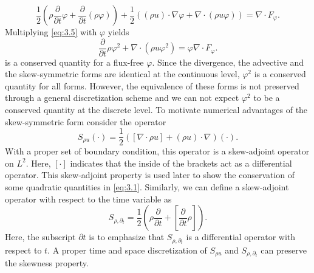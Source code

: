 \begin{equation} \label{eq:3.5}
	\frac{1}{2} \left( \rho \frac{\partial }{\partial t} \varphi + \frac{\partial }{\partial t} (\rho \varphi) \right) + \frac 1 2 \left( (\rho u)\cdot \nabla \varphi + \nabla \cdot (\rho u \varphi) \right) = \nabla \cdot F_{\varphi}.
\end{equation}
Multiplying \eqref{eq:3.5} with $\varphi$ yields
\begin{equation}
	\frac{\partial }{\partial t} \rho \varphi^2 + \nabla \cdot ( \rho u \varphi^2  ) = \varphi \nabla \cdot F_{\varphi}.
\end{equation}
 is a conserved quantity for a flux-free $\varphi$. Since the divergence, the advective and the skew-symmetric forms are identical at the continuous level, $\varphi^2$ is a conserved quantity for all forms. However, the equivalence of these forms is not preserved through a general discretization scheme and we can not expect $\varphi^2$ to be a conserved quantity at the discrete level. To motivate numerical advantages of the skew-symmetric form consider the operator 
\begin{equation}
	S_{\rho u}(\cdot) = \frac 1 2 ( [ \nabla \cdot \rho u ] + (\rho u)\cdot \nabla )(\cdot).
\end{equation}
With a proper set of boundary condition, this operator is a skew-adjoint operator on $L^2$. Here, $[\cdot]$ indicates that the inside of the brackets act as a differential operator. This skew-adjoint property is used later to show the conservation of some quadratic quantities in \eqref{eq:3.1}. Similarly, we can define a skew-adjoint operator with respect to the time variable as
\begin{equation}
	S_{\rho,\partial_t} = \frac{1}{2} \left( \rho \frac{\partial}{\partial t} + [ \frac{\partial}{\partial t} \rho] \right).
\end{equation}
Here, the subscript $\partial t$ is to emphasize that $S_{\rho,\partial_t}$ is a differential operator with respect to $t$. A proper time and space discretization of $S_{\rho u}$ and $S_{\rho,\partial_t}$ can preserve the skewness property.

